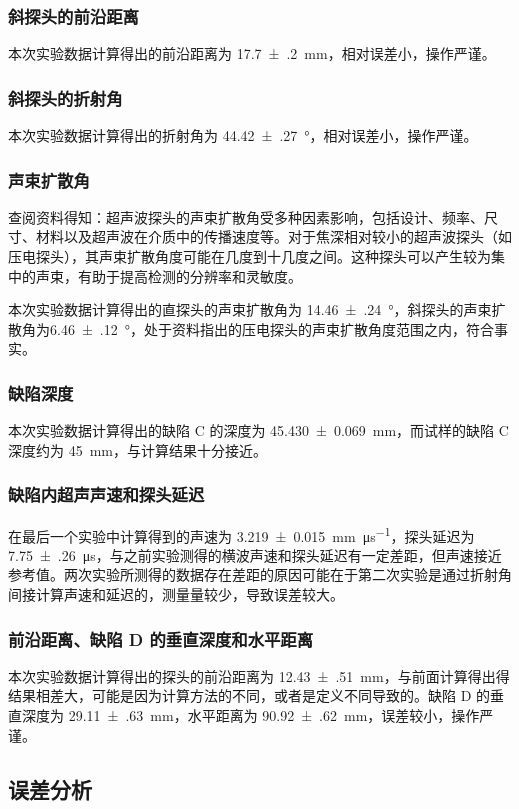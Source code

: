 \documentclass[a4paper,utf8]{article}
\begin{document}
\subsubsection{斜探头的前沿距离}
本次实验数据计算得出的前沿距离为 \SI{17.7(2)}{\mm}，相对误差小，操作严谨。
\subsubsection{斜探头的折射角}
本次实验数据计算得出的折射角为 \SI{44.42(27)}{\degree}，相对误差小，操作严谨。
\subsubsection{声束扩散角}
查阅资料得知：超声波探头的声束扩散角受多种因素影响，包括设计、频率、尺寸、材料以及超声波在介质中的传播速度等。对于焦深相对较小的超声波探头（如压电探头），其声束扩散角度可能在几度到十几度之间。这种探头可以产生较为集中的声束，有助于提高检测的分辨率和灵敏度。\par
本次实验数据计算得出的直探头的声束扩散角为 \SI{14.46(24)}{\degree}，斜探头的声束扩散角为\linebreak \SI{6.46(12)}{\degree}，处于资料指出的压电探头的声束扩散角度范围之内，符合事实。
\subsubsection{缺陷深度}
本次实验数据计算得出的缺陷 C 的深度为 \SI{45.430(69)}{\mm}，而试样的缺陷 C 深度约为 \SI{45}{\mm}，与计算结果十分接近。
\subsubsection{缺陷内超声声速和探头延迟}
在最后一个实验中计算得到的声速为 \SI{3.219(15)}{\mm\per\us}，探头延迟为 \SI{7.75(26)}{\us}，与之前实验测得的横波声速和探头延迟有一定差距，但声速接近参考值。两次实验所测得的数据存在差距的原因可能在于第二次实验是通过折射角间接计算声速和延迟的，测量量较少，导致误差较大。
\subsubsection{前沿距离、缺陷 D 的垂直深度和水平距离}
本次实验数据计算得出的探头的前沿距离为 \SI{12.43(51)}{\mm}，与前面计算得出得结果相差大，可能是因为计算方法的不同，或者是定义不同导致的。缺陷 D 的垂直深度为 \SI{29.11(63)}{\mm}，水平距离为 \SI{90.92(62)}{\mm}，误差较小，操作严谨。
\subsection{误差分析}
\end{document}
